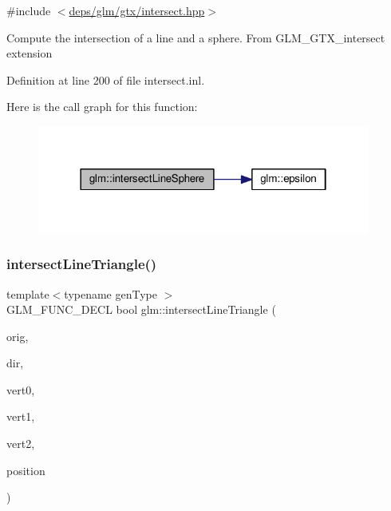 {\ttfamily \#include $<$\hyperlink{intersect_8hpp}{deps/glm/gtx/intersect.\+hpp}$>$}

Compute the intersection of a line and a sphere. From G\+L\+M\+\_\+\+G\+T\+X\+\_\+intersect extension 

Definition at line 200 of file intersect.\+inl.

Here is the call graph for this function\+:
\nopagebreak
\begin{figure}[H]
\begin{center}
\leavevmode
\includegraphics[width=310pt]{df/d2a/group__gtx__intersect_ga9c68139f3d8a4f3d7fe45f9dbc0de5b7_cgraph}
\end{center}
\end{figure}
\mbox{\label{group__gtx__intersect_ga9d29b9b3acb504d43986502f42740df4}} 
\subsubsection{\texorpdfstring{intersect\+Line\+Triangle()}{intersectLineTriangle()}}
{\footnotesize\ttfamily template$<$typename gen\+Type $>$ \\
G\+L\+M\+\_\+\+F\+U\+N\+C\+\_\+\+D\+E\+CL bool glm\+::intersect\+Line\+Triangle (\begin{DoxyParamCaption}\item[{gen\+Type const \&}]{orig,  }\item[{gen\+Type const \&}]{dir,  }\item[{gen\+Type const \&}]{vert0,  }\item[{gen\+Type const \&}]{vert1,  }\item[{gen\+Type const \&}]{vert2,  }\item[{gen\+Type \&}]{position }\end{DoxyParamCaption})}



